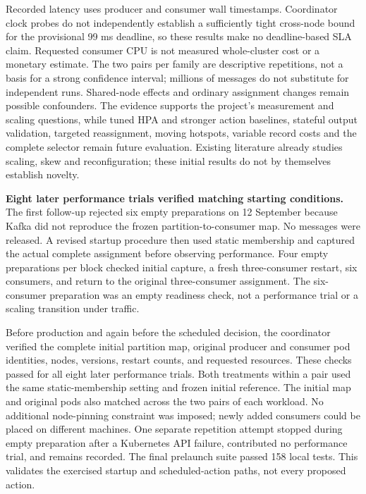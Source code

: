 Recorded latency uses producer and consumer wall timestamps. Coordinator clock probes do not independently establish a sufficiently tight cross-node bound for the provisional 99 ms deadline, so these results make no deadline-based SLA claim. Requested consumer CPU is not measured whole-cluster cost or a monetary estimate. The two pairs per family are descriptive repetitions, not a basis for a strong confidence interval; millions of messages do not substitute for independent runs. Shared-node effects and ordinary assignment changes remain possible confounders. The evidence supports the project's measurement and scaling questions, while tuned HPA and stronger action baselines, stateful output validation, targeted reassignment, moving hotspots, variable record costs and the complete selector remain future evaluation. Existing literature already studies scaling, skew and reconfiguration; these initial results do not by themselves establish novelty.

\textbf{Eight later performance trials verified matching starting conditions.} The first follow-up rejected six empty preparations on 12 September because Kafka did not reproduce the frozen partition-to-consumer map. No messages were released. A revised startup procedure then used static membership and captured the actual complete assignment before observing performance. Four empty preparations per block checked initial capture, a fresh three-consumer restart, six consumers, and return to the original three-consumer assignment. The six-consumer preparation was an empty readiness check, not a performance trial or a scaling transition under traffic.

Before production and again before the scheduled decision, the coordinator verified the complete initial partition map, original producer and consumer pod identities, nodes, versions, restart counts, and requested resources. These checks passed for all eight later performance trials. Both treatments within a pair used the same static-membership setting and frozen initial reference. The initial map and original pods also matched across the two pairs of each workload. No additional node-pinning constraint was imposed; newly added consumers could be placed on different machines. One separate repetition attempt stopped during empty preparation after a Kubernetes API failure, contributed no performance trial, and remains recorded. The final prelaunch suite passed 158 local tests. This validates the exercised startup and scheduled-action paths, not every proposed action.

